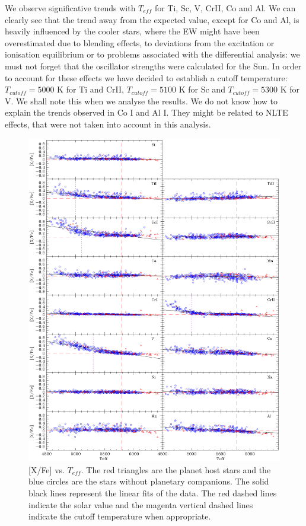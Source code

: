 \documentclass[dvips,12pt,a4paper]{report}
\begin{document}
{{\begin{table}[h]
\begin{tabular}{ c r@{$\pm$}l r@{$\pm$}l | c r@{$\pm$}l r@{$\pm$}l}
\end{tabular}
\end{table}

We observe significative trends with $T_{eff}$ for Ti, Sc, V, CrII, Co and Al. We can clearly see that the trend away from the expected value, except for Co and Al, is heavily influenced by the cooler stars, where the EW might have been overestimated due to blending effects, to deviations from the excitation or ionisation equilibrium or to problems associated with the differential analysis: we must not forget that the oscillator strengths were calculated for the Sun. In order to account for these effects we have decided to establish a cutoff temperature: $T_{cutoff}=5000$ K for Ti and CrII, $T_{cutoff}=5100$ K for Sc and $T_{cutoff}=5300$ K for V. We shall note this when we analyse the results. We do not know how to explain the trends observed in Co I and Al I. They might be related to NLTE effects, that were not taken into account in this analysis.

\begin{figure}[h!]
\centering
\includegraphics[trim=0cm 1.5cm 0cm 1cm,clip,width=16cm]{pics/parte3/xfeteff.eps}
\caption[depois]{[X/Fe] vs. $T_{eff}$. The red triangles are the planet host stars and the blue circles are the stars without planetary companions. The solid black lines represent the linear fits of the data. The red dashed lines indicate the solar value and the magenta vertical dashed lines indicate the cutoff temperature when appropriate.}
\label{xfeteff}
\end{figure}

}}
\end{document}
